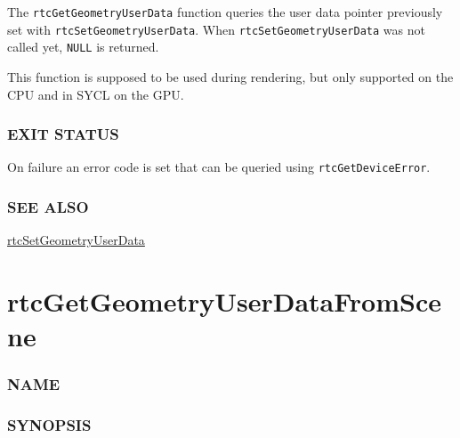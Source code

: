 The \texttt{rtcGetGeometryUserData} function queries the user data
pointer previously set with \texttt{rtcSetGeometryUserData}. When
\texttt{rtcSetGeometryUserData} was not called yet, \texttt{NULL} is
returned.

This function is supposed to be used during rendering, but only
supported on the CPU and in SYCL on the GPU.

\subsubsection{EXIT STATUS}\label{exit-status}

On failure an error code is set that can be queried using
\texttt{rtcGetDeviceError}.

\subsubsection{SEE ALSO}\label{see-also}

\hyperref[rtcsetgeometryuserdata]{rtcSetGeometryUserData}

\pagebreak

\section{rtcGetGeometryUserDataFromScene}\label{rtcgetgeometryuserdatafromscene}

\subsubsection{NAME}\label{name}

\begin{Shaded}
\begin{Highlighting}[]
\OperatorTok{{-}}
\end{Highlighting}
\end{Shaded}

\subsubsection{SYNOPSIS}\label{synopsis}

\begin{Shaded}
\begin{Highlighting}[]

\OperatorTok{*}\OperatorTok{(}\OperatorTok{,}  \OperatorTok{);}
\end{Highlighting}
\end{Shaded}

